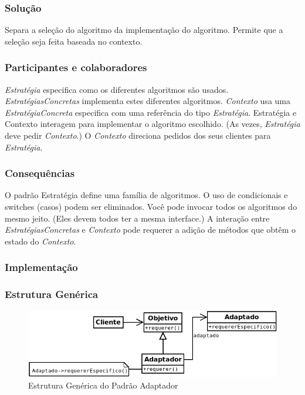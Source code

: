 \subsubsection{Solução}
Separa a seleção do algoritmo da implementação do algoritmo. Permite que a seleção seja feita baseada no contexto.

\subsubsection{Participantes e colaboradores}
\emph{Estratégia} especifica como os diferentes algoritmos são usados. \emph{EstratégiasConcretas} implementa estes diferentes algoritmos. \emph{Contexto} usa uma \emph{EstratégiaConcreta} especifica com uma referência do tipo \emph{Estratégia}. Estratégia e Contexto interagem para implementar o algoritmo escolhido. (As vezes, \emph{Estratégia} deve pedir \emph{Contexto}.) O \emph{Contexto} direciona pedidos dos seus clientes para \emph{Estratégia}.

\subsubsection{Consequências}
O padrão Estratégia define uma família de algoritmos. O uso de condicionais e switches (casos) podem ser eliminados. Você pode invocar todos os algoritmos do mesmo jeito. (Eles devem todos ter a mesma interface.) A interação entre \emph{EstratégiasConcretas} e \emph{Contexto} pode requerer a adição de métodos que obtêm o estado do \emph{Contexto}.

\subsubsection{Implementação}
\subsubsection{Estrutura Genérica}

\begin{figure}[h]
\begin{center}
\includegraphics[scale=0.6]{adaptador.png}
\caption{Estrutura Genérica do Padrão Adaptador}\label{fig:adaptador}
\end{center}
\end{figure}

